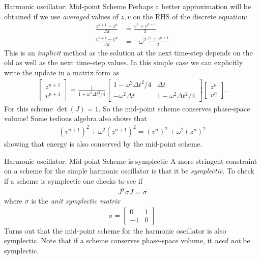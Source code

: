 \documentclass[pdf]{beamer}
\theoremstyle{definition}
\begin{document}
\begin{frame}{Harmonic oscillator: Mid-point Scheme}
  \small%
  Perhaps a better approximation will be obtained if we use
  \emph{averaged} values of $z,v$ on the RHS of the discrete
  equation:
  \begin{align*}
    \frac{z^{n+1}-z^n}{\Delta t} &= \frac{v^n +v^{n+1}}{2} \\
    \frac{v^{n+1}-v^n}{\Delta t} &= -\omega^2\frac{z^n + z^{n+1}}{2}
  \end{align*}
  This is an \emph{implicit} method as the solution at the next
  time-step depends on the old as well as the next time-step
  values. In this simple case we can explicitly write the update in a
  matrix form as
  \begin{align*}
    \left[
    \begin{matrix}
      z^{n+1} \\
      v^{n+1}
    \end{matrix}
      \right]
      =
      \frac{1}{1+\omega^2\Delta t^2/4}
    \left[
      \begin{matrix}
        1-\omega^2\Delta t^2/4  & \Delta t \\
        -\omega^2 \Delta t & 1-\omega^2\Delta t^2/4
      \end{matrix}
    \right]
    \left[
    \begin{matrix}
      z^{n} \\
      v^{n}
    \end{matrix}
    \right].                        
  \end{align*}
  For this scheme $\det(J)=1$. So the mid-point scheme conserves
  phase-space volume! Some tedious algebra also shows that
  \begin{align*}
    (v^{n+1})^2 + \omega^2 (z^{n+1})^2 = (v^{n})^2 + \omega^2 (z^{n})^2
  \end{align*}
  showing that energy is also conserved by the mid-point scheme.
\end{frame}

\begin{frame}{Harmonic oscillator: Mid-point Scheme is symplectic}
  A more stringent constraint on a scheme for the simple harmonic
  oscillator is that it be \emph{symplectic}. To check if a scheme is
  symplectic one checks to see if
  \begin{align*}
    J^T\sigma J = \sigma
  \end{align*}
  where $\sigma$ is the \emph{unit symplectic matrix}
  \begin{align*}
    \sigma
    =
    \left[
      \begin{matrix}
        0 & 1 \\
        -1 & 0
      \end{matrix}
    \right]    
  \end{align*}
  Turns out that the mid-point scheme for the harmonic oscillator is
  also symplectic. Note that if a scheme conserves phase-space
  volume, it \emph{need not} be symplectic.
\end{frame}
\end{document}
